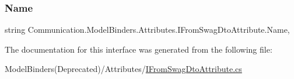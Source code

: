 \subsubsection{\texorpdfstring{Name}{Name}}
{\footnotesize\ttfamily string Communication.\+Model\+Binders.\+Attributes.\+I\+From\+Swag\+Dto\+Attribute.\+Name\hspace{0.3cm}{\ttfamily [get]}, {\ttfamily [set]}}



The documentation for this interface was generated from the following file\+:\begin{DoxyCompactItemize}
\item 
Model\+Binders(\+Deprecated)/\+Attributes/\mbox{\hyperlink{_i_from_swag_dto_attribute_8cs}{I\+From\+Swag\+Dto\+Attribute.\+cs}}\end{DoxyCompactItemize}
